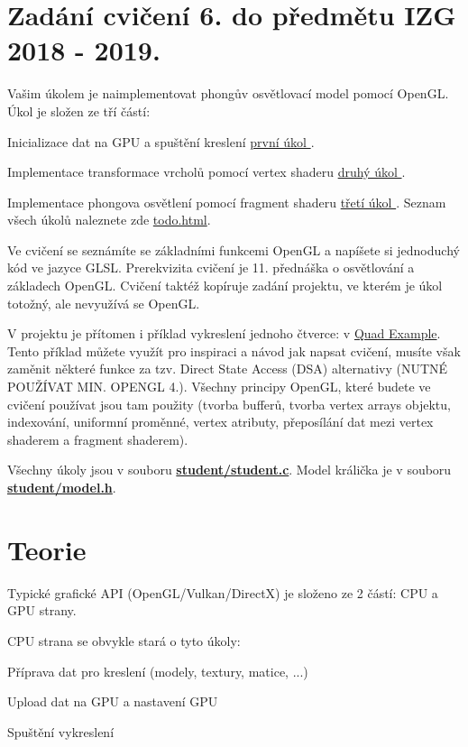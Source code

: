 \hypertarget{index_zadani}{}\section{Zadání cvičení 6. do předmětu I\+Z\+G 2018 -\/ 2019.}\label{index_zadani}
Vašim úkolem je naimplementovat phongův osvětlovací model pomocí Open\+G\+L. Úkol je složen ze tří částí\+:
\begin{DoxyItemize}
\item Inicializace dat na G\+P\+U a spuštění kreslení \hyperlink{group__task1}{první úkol }. 
\item Implementace transformace vrcholů pomocí vertex shaderu \hyperlink{group__task2}{druhý úkol }. 
\item Implementace phongova osvětlení pomocí fragment shaderu \hyperlink{group__task3}{třetí úkol }.  Seznam všech úkolů naleznete zde \hyperlink{todo}{todo.\+html}.
\end{DoxyItemize}

Ve cvičení se seznámíte se základními funkcemi Open\+G\+L a napíšete si jednoduchý kód ve jazyce G\+L\+S\+L. Prerekvizita cvičení je 11. přednáška o osvětlování a základech Open\+G\+L. Cvičení taktéž kopíruje zadání projektu, ve kterém je úkol totožný, ale nevyužívá se Open\+G\+L.

V projektu je přítomen i příklad vykreslení jednoho čtverce\+: v \hyperlink{quadExample-example}{Quad Example}. Tento příklad můžete využít pro inspiraci a návod jak napsat cvičení, musíte však zaměnit některé funkce za tzv. Direct State Access (D\+S\+A) alternativy (N\+U\+T\+NÉ P\+O\+UŽÍ\+V\+A\+T M\+I\+N. O\+P\+E\+N\+G\+L 4.). Všechny principy Open\+G\+L, které budete ve cvičení používat jsou tam použity (tvorba bufferů, tvorba vertex arrays objektu, indexování, uniformní proměnné, vertex atributy, přeposílání dat mezi vertex shaderem a fragment shaderem).

Všechny úkoly jsou v souboru {\bfseries \hyperlink{student_8c}{student/student.\+c}}. Model králička je v souboru {\bfseries \hyperlink{model_8h}{student/model.\+h}}.\hypertarget{index_teorie}{}\section{Teorie}\label{index_teorie}
Typické grafické A\+P\+I (Open\+G\+L/\+Vulkan/\+Direct\+X) je složeno ze 2 částí\+: C\+P\+U a G\+P\+U strany.

C\+P\+U strana se obvykle stará o tyto úkoly\+:
\begin{DoxyItemize}
\item Příprava dat pro kreslení (modely, textury, matice, ...)
\item Upload dat na G\+P\+U a nastavení G\+P\+U
\item Spuštění vykreslení
\end{DoxyItemize}

